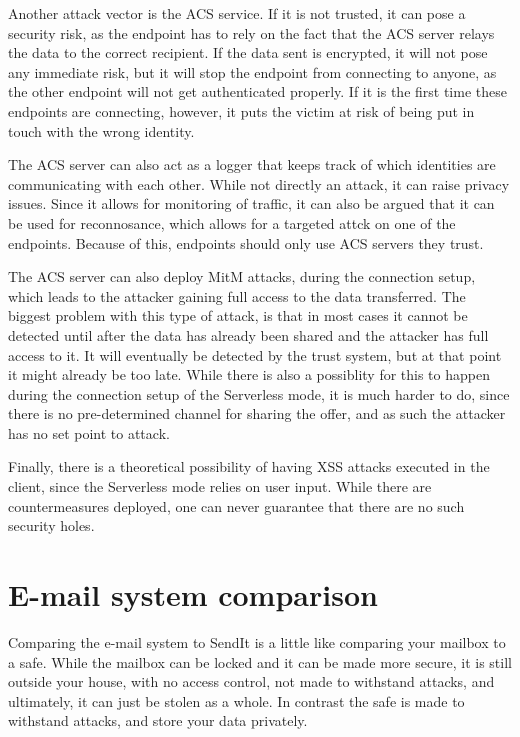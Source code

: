 	Another attack vector is the ACS service. If it is not trusted, it can pose a security risk, as the endpoint has to rely on the fact that the ACS server relays the data to the correct recipient. If the data sent is encrypted, it will not pose any immediate risk, but it will stop the endpoint from connecting to anyone, as the other endpoint will not get authenticated properly. If it is the first time these endpoints are connecting, however, it puts the victim at risk of being put in touch with the wrong identity.

	The ACS server can also act as a logger that keeps track of which identities are communicating with each other. While not directly an attack, it can raise privacy issues. Since it allows for monitoring of traffic, it can also be argued that it can be used for reconnosance, which allows for a targeted attck on one of the endpoints. Because of this, endpoints should only use ACS servers they trust.

	The ACS server can also deploy MitM attacks, during the connection setup, which leads to the attacker gaining full access to the data transferred. The biggest problem with this type of attack, is that in most cases it cannot be detected until after the data has already been shared and the attacker has full access to it. It will eventually be detected by the trust system, but at that point it might already be too late. While there is also a possiblity for this to happen during the connection setup of the Serverless mode, it is much harder to do, since there is no pre-determined channel for sharing the offer, and as such the attacker has no set point to attack. 

	Finally, there is a theoretical possibility of having XSS attacks executed in the client, since the Serverless mode relies on user input. While there are countermeasures deployed, one can never guarantee that there are no such security holes.
%
\section{E-mail system comparison}
	Comparing the e-mail system to SendIt is a little like comparing your mailbox to a safe. While the mailbox can be locked and it can be made more secure, it is still outside your house, with no access control, not made to withstand attacks, and ultimately, it can just be stolen as a whole. In contrast the safe is made to withstand attacks, and store your data privately.


